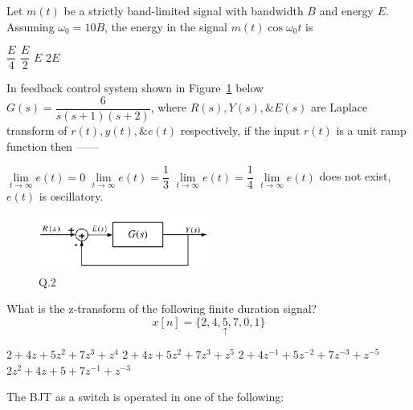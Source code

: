 \documentclass[a4, 11pt, addpoints]{exam}
\begin{document}
\begin{questions}
\question Let $m(t)$ be a strictly band-limited signal with bandwidth $B$ and energy $E$. Assuming $\omega_0 = 10B$, the energy in the signal $m(t) \cos \omega_0 t$ is\\[0.3cm]
\begin{oneparchoices}
\choice $\dfrac{E}{4}$
\choice $\dfrac{E}{2}$
\choice $E$
\choice $2E$
\end{oneparchoices}  
\question In feedback control system shown in Figure~\ref{q2} below $ G(s) = \dfrac{6}{s(s+1)(s+2)} $, where $R(s), Y(s), \& E(s)$ are Laplace transform of $r(t), y(t), \& e(t) $ respectively, if the input $r(t)$ is a unit ramp function then ------  \\[0.3cm]
\begin{oneparchoices}
\choice $\lim \limits_{t \to \infty } e(t) = 0$
\choice $\lim \limits_{t \to \infty } e(t) = \dfrac{1}{3}$
\choice $\lim \limits_{t \to \infty } e(t) = \dfrac{1}{4}$
\choice $\lim \limits_{t \to \infty } e(t) $ does not exist, $e(t)$ is oscillatory.
\end{oneparchoices}
\begin{figure}[h!]
\centering
\includegraphics[width=0.5\textwidth]{fbc.png}
\caption{Q.2}
\label{q2}
\end{figure}  
\question What is the z-transform of the following finite duration signal? \[ x[n] = \{ 2, 4, \underset{\uparrow}{5}, 7, 0, 1 \} \]
\begin{oneparchoices}
\choice $ 2 + 4z + 5z^2 + 7z^3 + z^4  $
\choice $2 + 4z + 5z^2 + 7z^3 + z^5$
\choice $ 2 + 4z^{-1} + 5z^{-2} + 7z^{-3} + z^{-5} $
\choice $ 2z^2 + 4z + 5 +7z^{-1} + z^{-3}$
\end{oneparchoices}  
\question The BJT as a switch is  operated in one of the following:
\begin{oneparchoices}

\end{oneparchoices}
\end{questions}
\end{document}
